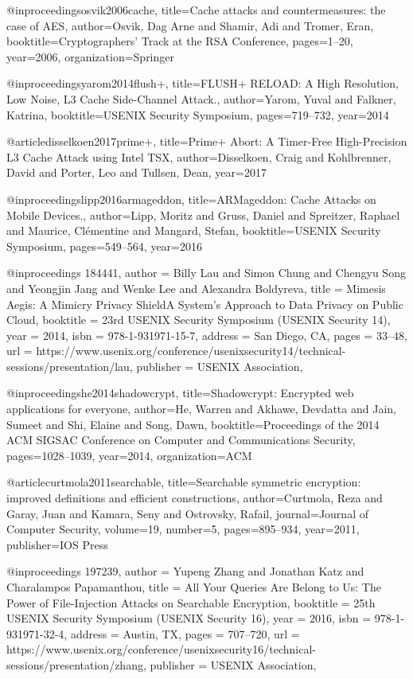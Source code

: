 @inproceedings{osvik2006cache,
  title={Cache attacks and countermeasures: the case of AES},
  author={Osvik, Dag Arne and Shamir, Adi and Tromer, Eran},
  booktitle={Cryptographers’ Track at the RSA Conference},
  pages={1--20},
  year={2006},
  organization={Springer}
}

@inproceedings{yarom2014flush+,
  title={FLUSH+ RELOAD: A High Resolution, Low Noise, L3 Cache Side-Channel Attack.},
  author={Yarom, Yuval and Falkner, Katrina},
  booktitle={USENIX Security Symposium},
  pages={719--732},
  year={2014}
}

@article{disselkoen2017prime+,
  title={Prime+ Abort: A Timer-Free High-Precision L3 Cache Attack using Intel TSX},
  author={Disselkoen, Craig and Kohlbrenner, David and Porter, Leo and Tullsen, Dean},
  year={2017}
}

@inproceedings{lipp2016armageddon,
  title={ARMageddon: Cache Attacks on Mobile Devices.},
  author={Lipp, Moritz and Gruss, Daniel and Spreitzer, Raphael and Maurice, Cl{\'e}mentine and Mangard, Stefan},
  booktitle={USENIX Security Symposium},
  pages={549--564},
  year={2016}
}

@inproceedings {184441,
author = {Billy Lau and Simon Chung and Chengyu Song and Yeongjin Jang and Wenke Lee and Alexandra Boldyreva},
title = {Mimesis Aegis: A Mimicry Privacy Shield{\textendash}A System{\textquoteright}s Approach to Data Privacy on Public Cloud},
booktitle = {23rd {USENIX} Security Symposium ({USENIX} Security 14)},
year = {2014},
isbn = {978-1-931971-15-7},
address = {San Diego, CA},
pages = {33--48},
url = {https://www.usenix.org/conference/usenixsecurity14/technical-sessions/presentation/lau},
publisher = {{USENIX} Association},
}

@inproceedings{he2014shadowcrypt,
  title={Shadowcrypt: Encrypted web applications for everyone},
  author={He, Warren and Akhawe, Devdatta and Jain, Sumeet and Shi, Elaine and Song, Dawn},
  booktitle={Proceedings of the 2014 ACM SIGSAC Conference on Computer and Communications Security},
  pages={1028--1039},
  year={2014},
  organization={ACM}
}

@article{curtmola2011searchable,
  title={Searchable symmetric encryption: improved definitions and efficient constructions},
  author={Curtmola, Reza and Garay, Juan and Kamara, Seny and Ostrovsky, Rafail},
  journal={Journal of Computer Security},
  volume={19},
  number={5},
  pages={895--934},
  year={2011},
  publisher={IOS Press}
}

@inproceedings {197239,
author = {Yupeng Zhang and Jonathan Katz and Charalampos Papamanthou},
title = {All Your Queries Are Belong to Us: The Power of File-Injection Attacks on Searchable Encryption},
booktitle = {25th {USENIX} Security Symposium ({USENIX} Security 16)},
year = {2016},
isbn = {978-1-931971-32-4},
address = {Austin, TX},
pages = {707--720},
url = {https://www.usenix.org/conference/usenixsecurity16/technical-sessions/presentation/zhang},
publisher = {{USENIX} Association},
}

